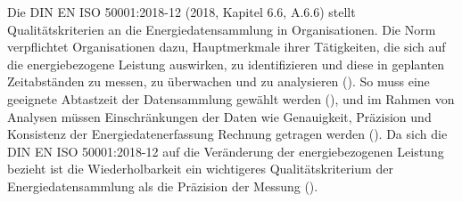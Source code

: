 Die DIN EN ISO 50001:2018-12 (2018, Kapitel 6.6, A.6.6) stellt Qualitätskriterien an die Energiedatensammlung in Organisationen.
Die Norm verpflichtet Organisationen dazu, Hauptmerkmale ihrer Tätigkeiten, die sich auf die energiebezogene Leistung auswirken, zu identifizieren und diese in geplanten
Zeitabständen zu messen, zu überwachen und zu analysieren (\cite[S. 23]{DIN50001.2018}).
So muss eine geeignete Abtastzeit der Datensammlung gewählt werden (\cite[S. 20]{DIN50006.2024}), und im Rahmen von Analysen müssen Einschränkungen der Daten 
wie Genauigkeit, Präzision und Konsistenz der Energiedatenerfassung Rechnung getragen werden (\cite[S. 37]{DIN50001.2018}).  
Da sich die DIN EN ISO 50001:2018-12 auf die Veränderung der energiebezogenen Leistung bezieht ist die Wiederholbarkeit ein wichtigeres Qualitätskriterium der 
Energiedatensammlung als die Präzision der Messung (\cite[S. 3]{Szajdzicki.2017}).